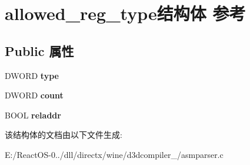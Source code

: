 \hypertarget{structallowed__reg__type}{}\section{allowed\+\_\+reg\+\_\+type结构体 参考}
\label{structallowed__reg__type}
\subsection*{Public 属性}
\begin{DoxyCompactItemize}
\item 
\mbox{\label{structallowed__reg__type_aff23eee946af9d247d553af9cccc70fa}} 
D\+W\+O\+RD {\bfseries type}
\item 
\mbox{\label{structallowed__reg__type_a03b33542c9c1e46ab4b1e4fbbeaaefd9}} 
D\+W\+O\+RD {\bfseries count}
\item 
\mbox{\label{structallowed__reg__type_a0e976b11bcc294320ed13ccfca560cb8}} 
B\+O\+OL {\bfseries reladdr}
\end{DoxyCompactItemize}


该结构体的文档由以下文件生成\+:\begin{DoxyCompactItemize}
\item 
E\+:/\+React\+O\+S-\/0../dll/directx/wine/d3dcompiler\+\_/asmparser.\+c\end{DoxyCompactItemize}
